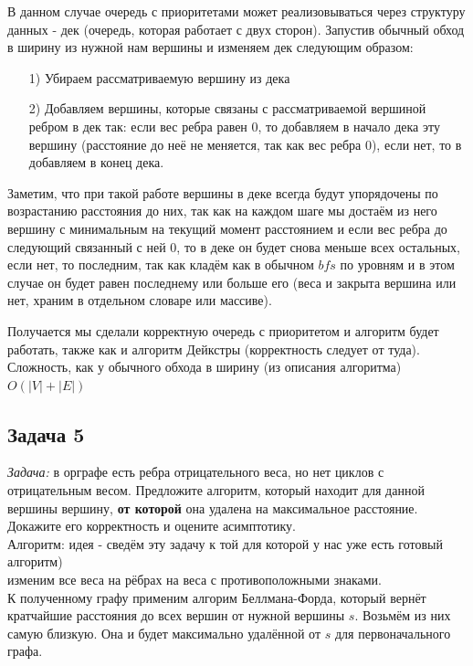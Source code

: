 \documentclass[a4paper,12pt]{article} %
\begin{document}
В данном случае очередь с приоритетами может реализовываться через структуру данных - дек (очередь, которая работает с двух сторон). Запустив обычный обход в ширину из нужной нам вершины и изменяем дек следующим образом:
\begin{itemize}
\item[1) ] Убираем рассматриваемую вершину из дека
\item[2) ] Добавляем вершины, которые связаны с рассматриваемой вершиной ребром в дек так: если вес ребра равен 0, то добавляем в начало дека эту вершину (расстояние до неё не меняется, так как вес ребра 0), если нет, то в добавляем в конец дека.
\end{itemize}
Заметим, что при такой работе вершины в деке всегда будут упорядочены по возрастанию расстояния до них, так как на каждом шаге мы достаём из него вершину с минимальным на текущий момент расстоянием и если вес ребра до следующий связанный с ней 0, то в деке он будет снова меньше всех остальных, если нет, то последним, так как кладём как в обычном $ bfs $ по уровням и в этом случае он будет равен последнему или больше его (веса и закрыта вершина или нет, храним в отдельном словаре или массиве).

Получается мы сделали корректную очередь с приоритетом и алгоритм будет работать, также как и алгоритм Дейкстры (корректность следует от туда).\\

Сложность, как у обычного обхода в ширину (из описания алгоритма) $ O(|V|+|E|)$


\subsection*{Задача 5}
\textit{Задача:} в орграфе есть ребра отрицательного веса, но нет циклов с отрицательным весом. Предложите алгоритм, который находит для данной вершины вершину, \textbf{от которой} она удалена на максимальное расстояние. Докажите его корректность и оцените асимптотику.\\

Алгоритм: идея - сведём эту задачу к той для которой у нас уже есть готовый алгоритм)\\
изменим все веса на рёбрах на веса с противоположными знаками.\\
К полученному графу применим алгорим Беллмана-Форда, который вернёт кратчайшие расстояния до всех вершин от нужной вершины $ s $. Возьмём из них самую близкую. Она и будет максимально удалённой от  $ s $ для первоначального графа. \\
\end{document}
